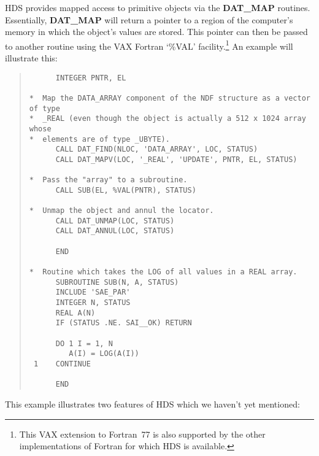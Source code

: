 HDS provides mapped access to primitive objects via the {\bf DAT\_MAP} routines.
Essentially, {\bf DAT\_MAP} will return a pointer to a region of the computer's
memory in which the object's values are stored.
This pointer can then be passed to another routine using the VAX Fortran `\%VAL'
facility.\footnote{This VAX extension to Fortran~77 is also supported by the
other implementations of Fortran for which HDS is available.}
An example will illustrate this:

\begin{quote}

\begin{small}
\begin{verbatim}
      INTEGER PNTR, EL

*  Map the DATA_ARRAY component of the NDF structure as a vector of type
*  _REAL (even though the object is actually a 512 x 1024 array whose
*  elements are of type _UBYTE).
      CALL DAT_FIND(NLOC, 'DATA_ARRAY', LOC, STATUS)
      CALL DAT_MAPV(LOC, '_REAL', 'UPDATE', PNTR, EL, STATUS)

*  Pass the "array" to a subroutine.
      CALL SUB(EL, %VAL(PNTR), STATUS)

*  Unmap the object and annul the locator.
      CALL DAT_UNMAP(LOC, STATUS)
      CALL DAT_ANNUL(LOC, STATUS)

      END

*  Routine which takes the LOG of all values in a REAL array.
      SUBROUTINE SUB(N, A, STATUS)
      INCLUDE 'SAE_PAR'
      INTEGER N, STATUS
      REAL A(N)
      IF (STATUS .NE. SAI__OK) RETURN

      DO 1 I = 1, N
         A(I) = LOG(A(I))
 1    CONTINUE

      END
\end{verbatim}
\end{small}

\end{quote}
This example illustrates two features of HDS which we haven't yet mentioned:

